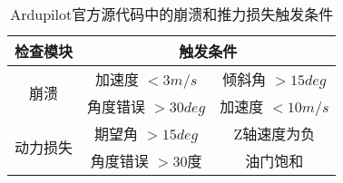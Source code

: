 \begin{table}[ht]
\caption{Ardupilot官方源代码中的崩溃和推力损失触发条件}
\label{tab:condition}
\centering
\begin{tabular}{c|c|c}
        \toprule[1.5pt]
        \textbf{检查模块} & \multicolumn{2}{c}{\textbf{触发条件}} \\
        \midrule[0.8pt]
        \multirow{2}{*}{崩溃} & 加速度 $ < 3m/s$  &  倾斜角 $ > 15 deg$ \\
        \cmidrule[0.8pt]{2-3}
          & 角度错误 $ > 30 deg$  &  加速度 $ < 10m/s$  \\
        \midrule[0.8pt]
        \multirow{2}{*}{动力损失} & 期望角 $ > 15 deg$  &  Z轴速度为负 \\
        \cmidrule[0.8pt]{2-3}
          & 角度错误 $ > 30 度$  &  油门饱和  \\
        \bottomrule[1.5pt]
\end{tabular}
\end{table}